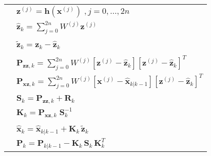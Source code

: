 \begingroup
\renewcommand{\arraystretch}{1.25}
\begin{tabular}{l l}
\phantom{.} & $\mathbf{z}^{(j)} = \mathbf{h} \left( \mathbf{x}^{(j)} \right) \; , j=0,\dots,2n$ \\
\phantom{.} & $\hat{\mathbf{z}}_k = \displaystyle{\sum_{j=0}^{2n}} W^{(j)} \mathbf{z}^{(j)}$ \\
\phantom{.} \\
\phantom{.} & $\tilde{\mathbf{z}}_k = \mathbf{z}_k - \hat{\mathbf{z}}_k$ \\
\phantom{.} \\
\phantom{.} & $\mathbf{P}_{\mathbf{zz},k} = \displaystyle{\sum_{j=0}^{2n}} W^{(j)} \left[ \mathbf{z}^{(j)} - \hat{\mathbf{z}}_k \right] \left[ \mathbf{z}^{(j)} - \hat{\mathbf{z}}_k \right]^T$ \\
\phantom{.} & $\mathbf{P}_{\mathbf{xz},k} = \displaystyle{\sum_{j=0}^{2n}} W^{(j)} \left[ \mathbf{x}^{(j)} - \hat{\mathbf{x}}_{k|k-1} \right] \left[ \mathbf{z}^{(j)} - \hat{\mathbf{z}}_k \right]^T$ \\
\phantom{.} \\
\phantom{.} & $\mathbf{S}_k = \mathbf{P}_{\mathbf{zz},k} + \mathbf{R}_k$ \\
\phantom{.} & $\mathbf{K}_k = \mathbf{P}_{\mathbf{xz},k} \; \mathbf{S}_k^{-1}$ \\
\phantom{.} \\
\phantom{.} & $\hat{\mathbf{x}}_k = \hat{\mathbf{x}}_{k|k-1} +\mathbf{K}_k \, \tilde{\mathbf{z}}_k$ \\
\phantom{.} & $\mathbf{P}_k = \mathbf{P}_{k|k-1} - \mathbf{K}_k \, \mathbf{S}_k \, \mathbf{K}_k^T$
\end{tabular}
\endgroup

